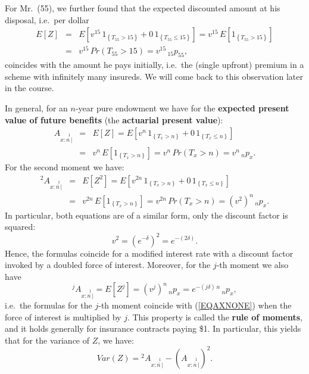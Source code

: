 \documentclass[11pt,fleqn,oneside]{book}
\begin{document}
For Mr.\ (55), we further found that the expected discounted amount at his disposal, i.e.\ per dollar
\begin{eqnarray*}
E[Z] &=& E\left[v^{15}\, 1_{\left\{T_{55} > 15\right\}} + 0\, 1_{\left\{T_{55} \leq 15 \right\}}\right] = v^{15}\,E\left[1_{\left\{T_{55} > 15\right\}} \right] \\
&=& v^{15}\, Pr\left(T_{55} > 15 \right) 
= v^{15}\,{_{15}p_{55}},
\end{eqnarray*}
coincides with the amount he pays initially, i.e.\ the (single upfront) premium in a scheme with infinitely many insureds. We will come back to this observation later in the course. 

In general, for an $n$-year pure endowment we have for the \textbf{expected present value of future benefits} (the \textbf{actuarial present value}):
\begin{eqnarray}
A_{x:\stackrel{1}{\overline{n\,}|}} &=& E[Z] 
=  E\left[v^{n}\, 1_{\left\{T_x > n\right\}} + 0\, 1_{\left\{T_x \leq n \right\}}\right] \nonumber \\
&=& v^{n}\,E\left[1_{\left\{T_x > n\right\}} \right]  
= v^{n}\, Pr\left(T_x > n \right)  
= v^{n}\,{_{n}p_{x}}. \label{EQAXNONE}
\end{eqnarray}
For the second moment we have:
\begin{eqnarray*}
{^2A_{x:\stackrel{1}{\overline{n\,}|}}} &=& E\left[Z^2\right] 
=  E\left[v^{2n}\, 1_{\left\{T_x > n\right\}} + 0\, 1_{\left\{T_x \leq n \right\}}\right] \\
&=& v^{2n}\,E\left[1_{\left\{T_x > n\right\}} \right] 
= v^{2n}\, Pr\left(T_x > n \right) 
= \left(v^2\right)^{n}\,{_{n}p_{x}}.
\end{eqnarray*}
In particular, both equations are of a similar form, only the discount factor is squared:
$$
v^2 = \left(e^{-\delta}\right)^2 = e^{-(2\delta)}.
$$
Hence, the formulas coincide for a modified interest rate with a discount factor invoked by a doubled force of interest. Moreover, for the $j$-th moment we also have
$$
{^jA_{x:\stackrel{1}{\overline{n\,}|}}} = E\left[Z^j\right] = \left(v^j\right)^{n}\,{_{n}p_{x}} = e^{-(j \delta)\,n}
\,{_{n}p_{x}},
$$
i.e.\ the formulas for the $j$-th moment coincide with (\ref{EQAXNONE}) when the force of interest is multiplied by $j$. This property is called the \textbf{rule of moments}, and it holds generally for insurance contracts paying \$1. In particular, this yields that for the variance of $Z$, we have:
$$
Var(Z) = {^2A_{x:\stackrel{1}{\overline{n\,}|}}} - \left(A_{x:\stackrel{1}{\overline{n\,}|}}\right)^2.
$$
\end{document}
